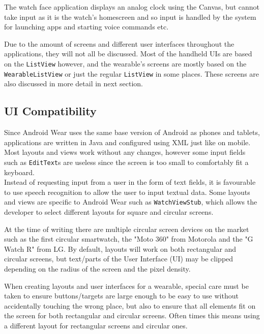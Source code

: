 The watch face application displays an analog clock using the Canvas, but cannot
take input as it is the watch's homescreen and so input is handled by the system
for launching apps and starting voice commands etc.

Due to the amount of screens and different user interfaces throughout the
applications, they will not all be discussed. Most of the handheld UIs are based
on the \texttt{ListView} however, and the wearable's screens are mostly based
on the \texttt{WearableListView} or just the regular \texttt{ListView} in some
places. These screens are also discussed in more detail in next section.

\subsection{UI Compatibility}
Since Android Wear uses the same base version of Android as phones and tablets,
applications are written in Java and configured using XML just like on mobile.
Most layouts and views work without any changes, however some input fields such
as \texttt{EditText}s are useless since the screen is too small to comfortably
fit a keyboard.\\
Instead of requesting input from a user in the form of text fields, it is
favourable to use speech recognition to allow the user to input textual data.
Some layouts and views are specific to Android Wear such as
\texttt{WatchViewStub}, which allows the developer to select different layouts
for square and circular screens.

At the time of writing there are multiple circular screen devices on the market
such as the first circular smartwatch, the "Moto 360" from Motorola and the "G
Watch R" from LG. By default, layouts will work on both rectangular and
circular screens, but text/parts of the User Interface (UI) may be clipped
depending on the radius of the screen and the pixel density.

When creating layouts and user interfaces for a wearable, special care must be
taken to ensure buttons/targets are large enough to be easy to use without
accidentally touching the wrong place, but also to ensure that all elements fit
on the screen for both rectangular and circular screens. Often times this means
using a different layout for rectangular screens and circular ones.
